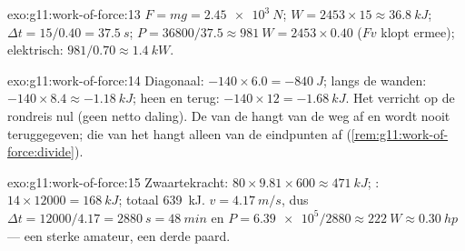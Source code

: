 \begin{solution}{exo:g11:work-of-force:13}
$F = mg = \qty{2.45e3}{N}$; $W = 2453 \times 15 \approx \qty{36.8}{kJ}$;
$\Delta t = 15/0.40 = \qty{37.5}{s}$;
$P = 36800/37.5 \approx \qty{981}{W} = 2453 \times 0.40$ ($Fv$ klopt
ermee); elektrisch: $981/0.70 \approx \qty{1.4}{kW}$.
\end{solution}

\begin{solution}{exo:g11:work-of-force:14}
Diagonaal: $-140 \times 6.0 = -\qty{840}{J}$; langs de wanden:
$-140 \times 8.4 \approx -\qty{1.18}{kJ}$; heen en terug:
$-140 \times 12 = -\qty{1.68}{kJ}$. Het  verricht op de rondreis
nul (geen netto daling). De  van de  hangt van de weg af en
wordt nooit teruggegeven; die van het  hangt alleen van de
eindpunten af (\cref{rem:g11:work-of-force:divide}).
\end{solution}

\begin{solution}{exo:g11:work-of-force:15}
Zwaartekracht: $80 \times 9.81 \times 600 \approx \qty{471}{kJ}$;
: $14 \times 12000 = \qty{168}{kJ}$; totaal \qty{639}{kJ}.
$v = \qty{4.17}{m/s}$, dus $\Delta t = 12000/4.17 = \qty{2880}{s} =
\qty{48}{min}$ en $P = \num{6.39e5}/2880 \approx \qty{222}{W} \approx
\qty{0.30}{hp}$ --- een sterke amateur, een derde paard.
\end{solution}

